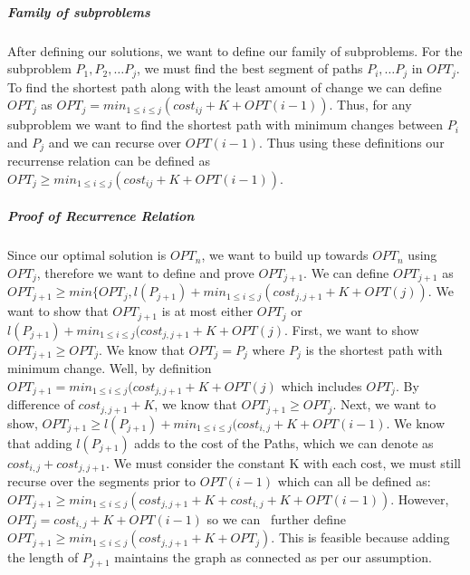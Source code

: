 \documentclass[10pt]{article}
\begin{document}
{\subparagraph{Family of subproblems} After defining our solutions, we want to define our family of subproblems. For the subproblem $P_1, P_2, \ldots P_j$, we must find the best segment of paths $P_i, \ldots P_j$ in $OPT_j$. 
To find the shortest path along with the least amount of change we can define $OPT_j$ as $OPT_j = min_{1 \leq i \leq j} (cost_{ij} + K + OPT(i-1))$. Thus, for any subproblem we want to find the shortest path with minimum changes 
between $P_i$ and $P_j$ and we can recurse over $OPT(i-1)$. Thus using these definitions our recurrense relation can be defined as $OPT_j \geq min_{1 \leq i \leq j} (cost_{ij} + K + OPT(i-1))$. 

\subparagraph{Proof of Recurrence Relation} Since our optimal solution is $OPT_n$, we want to build up towards $OPT_n$ using $OPT_j$, therefore we want to define and prove $OPT_{j+1}$. We can define $OPT_{j+1}$ as 
$OPT_{j+1} \geq min\{OPT_j, l(P_{j+1}) + min_{1 \leq i \leq j} (cost_{j, j+1} + K + OPT(j))$. We want to show that $OPT_{j+1}$ is at most either $OPT_j$ or $l(P_{j+1}) + min_{1 \leq i \leq j} (cost_{j, j+1} + K + OPT(j)$. First,
we want to show $OPT_{j+1} \geq OPT_j$. We know that $OPT_j = P_j$ where $P_j$ is the shortest path with minimum change. Well, by definition $OPT_{j+1} = min_{1 \leq i \leq j} (cost_{j, j+1} + K + OPT(j)$ which includes $OPT_j$. By difference of $cost_{j,j+1} + K$, we know that
$OPT_{j+1} \geq OPT_j$. Next, we want to show, $OPT_{j+1} \geq l(P_{j+1}) + min_{1 \leq i \leq j} (cost_{i, j} + K + OPT(i-1)$. We know that adding $l(P_{j+1})$ adds to the cost of the Paths, which we can denote as $cost_{i,j} + cost_{j, j+1}$. We must consider 
the constant K with each cost, we must still recurse over the segments prior to $OPT(i-1)$ which can all be defined as: $OPT_{j+1} \geq min_{1 \leq i \leq j} (cost_{j, j+1} + K + cost_{i,j} + K + OPT(i-1))$. However, $OPT_j = cost_{i,j} + K + OPT(i-1)$ so we can \
further define $OPT_{j+1} \geq min_{1 \leq i \leq j} (cost_{j, j+1} + K + OPT_j)$. This is feasible because adding the length of $P_{j+1}$ maintains the graph as connected as per our assumption.  




}




\newpage
\medskip{}
\end{document}
